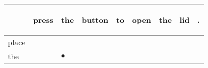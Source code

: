 \documentclass[landscape]{article}
\newcommand{\ssp}{\hspace{2pt}}
\newcommand{\mex}{\cellcolor{g}$\bullet$}
\begin{document}
\newpage

\noindent\begin{tabular}{|l|p{10pt}|p{10pt}|p{10pt}|p{10pt}|p{10pt}|p{10pt}|p{10pt}|p{10pt}|}
\hline
&\begin{sideways}\cellcolor{ref0}press\hspace{12pt}\end{sideways}&\begin{sideways}\cellcolor{ref1}the\hspace{12pt}\end{sideways}&\begin{sideways}\cellcolor{ref2}button\hspace{12pt}\end{sideways}&\begin{sideways}\cellcolor{ref3}to\hspace{12pt}\end{sideways}&\begin{sideways}\cellcolor{ref4}open\hspace{12pt}\end{sideways}&\begin{sideways}\cellcolor{ref5}the\hspace{12pt}\end{sideways}&\begin{sideways}\cellcolor{ref6}lid\hspace{12pt}\end{sideways}&\begin{sideways}\cellcolor{ref7}.\hspace{12pt}\end{sideways}\\
\hline
\ssp place \ssp&\hspace{2pt}&\hspace{2pt}&\hspace{2pt}&\hspace{2pt}&\hspace{2pt}&\hspace{2pt}&\hspace{2pt}&\hspace{2pt}\\
\hline
\ssp \cellcolor{ref1}the \ssp&\hspace{2pt}&\hspace{2pt}\mex&\hspace{2pt}&\hspace{2pt}&\hspace{2pt}&\hspace{2pt}&\hspace{2pt}&\hspace{2pt}\\

\end{tabular}
\end{document}
